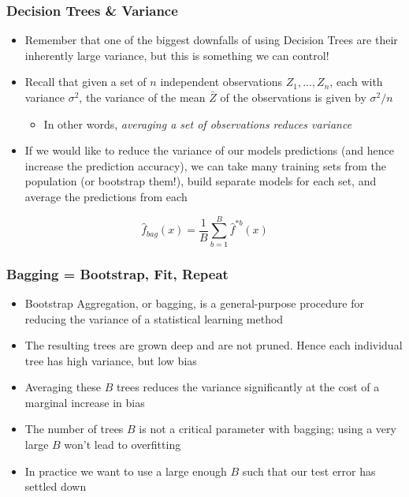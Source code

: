 \documentclass[table,dvipsnames]{beamer}
\newcommand{\keywd}{\textcolor{myorange}}
\begin{document}


\begin{frame}
\frametitle{Decision Trees \& Variance}
\footnotesize
\begin{itemize}
    \item Remember that one of the biggest downfalls of using Decision Trees are their inherently large variance, but this is something we can control!
    \item Recall that given a set of $n$ independent observations $Z_1, ..., Z_n$, each with variance $\sigma^2$, the variance of the mean $\bar{Z}$ of the observations is given by $\sigma^2/n$
    \footnotesize
    \begin{itemize}
        \item In other words, \textit{averaging a set of observations reduces variance}
    \end{itemize}
    \item If we would like to reduce the variance of our models predictions (and hence increase the prediction accuracy), we can take many training sets from the population (or \keywd{bootstrap} them!), build separate models for each set, and average the predictions from each
\end{itemize}

\begin{equation}
    \hat{f}_{bag}(x) = \frac{1}{B} \sum_{b=1}^B \hat{f}^{* b}(x)
\end{equation}
\end{frame}


\begin{frame}
\frametitle{Bagging = Bootstrap, Fit, Repeat}
\begin{itemize}
    \item \keywd{Bootstrap Aggregation}, or \keywd{bagging}, is a general-purpose procedure for reducing the variance of a statistical learning method
    \item The resulting trees are grown deep and are not pruned.  Hence each individual tree has high variance, but low bias
    \item Averaging these $B$ trees reduces the variance significantly at the cost of a marginal increase in bias
    \item The number of trees $B$ is not a critical parameter with bagging; using a very large $B$ won't lead to overfitting
    \item In practice we want to use a large enough $B$ such that our test error has settled down
\end{itemize}
\end{frame}
\end{document}
